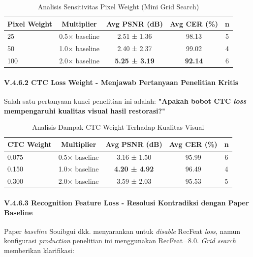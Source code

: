 \documentclass[12pt,a4paper]{article}
\begin{document}
\begin{table}[H]
\centering
\caption{Analisis Sensitivitas Pixel Weight (Mini Grid Search)}
\label{tab:pixel-sensitivity}
\footnotesize
\begin{tabular}{lcccc}
\hline
\textbf{Pixel Weight} & \textbf{Multiplier} & \textbf{Avg PSNR (dB)} & \textbf{Avg CER (\%)} & \textbf{n} \\
\hline
25 & 0.5× baseline & 2.51 ± 1.36 & 98.13 & 5 \\
50 & 1.0× baseline & 2.40 ± 2.37 & 99.02 & 4 \\
100 & 2.0× baseline & \textbf{5.25 ± 3.19} & \textbf{92.14} & 6 \\
\hline
\end{tabular}
\end{table}

\paragraph{V.4.6.2 CTC Loss Weight - Menjawab Pertanyaan Penelitian Kritis}

Salah satu pertanyaan kunci penelitian ini adalah: \textbf{"Apakah bobot CTC \textit{loss} mempengaruhi kualitas visual hasil restorasi?"}

\begin{table}[H]
\centering
\caption{Analisis Dampak CTC Weight Terhadap Kualitas Visual}
\label{tab:ctc-sensitivity}
\footnotesize
\begin{tabular}{lcccc}
\hline
\textbf{CTC Weight} & \textbf{Multiplier} & \textbf{Avg PSNR (dB)} & \textbf{Avg CER (\%)} & \textbf{n} \\
\hline
0.075 & 0.5× baseline & 3.16 ± 1.50 & 95.99 & 6 \\
0.150 & 1.0× baseline & \textbf{4.20 ± 4.92} & 96.49 & 4 \\
0.300 & 2.0× baseline & 3.59 ± 2.03 & 95.53 & 5 \\
\hline
\end{tabular}
\end{table}

\paragraph{V.4.6.3 Recognition Feature Loss - Resolusi Kontradiksi dengan Paper Baseline}

Paper \textit{baseline} Souibgui dkk. menyarankan untuk \textit{disable} RecFeat \textit{loss}, namun konfigurasi \textit{production} penelitian ini menggunakan RecFeat=8.0. \textit{Grid search} memberikan klarifikasi:
\end{document}
